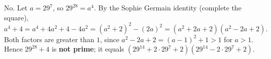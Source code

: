 No. Let $a=29^7$, so $29^{28}=a^4$. By the Sophie Germain identity (complete the square),
\[
a^4+4=a^4+4a^2+4-4a^2=(a^2+2)^2-(2a)^2=(a^2+2a+2)(a^2-2a+2).
\]
Both factors are greater than $1$, since $a^2-2a+2=(a-1)^2+1>1$ for $a>1$. Hence $29^{28}+4$ is \textbf{not prime}; it equals $(29^{14}+2\cdot29^7+2)(29^{14}-2\cdot29^7+2)$.
